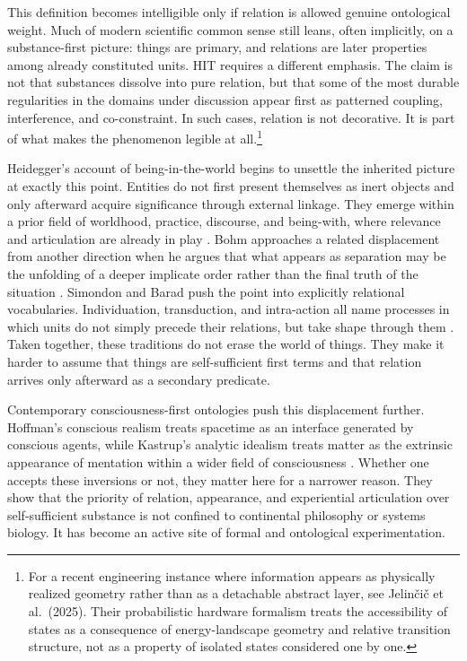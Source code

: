 This definition becomes intelligible only if relation is allowed genuine ontological weight. Much of modern scientific common sense still leans, often implicitly, on a substance-first picture: things are primary, and relations are later properties among already constituted units. HIT requires a different emphasis. The claim is not that substances dissolve into pure relation, but that some of the most durable regularities in the domains under discussion appear first as patterned coupling, interference, and co-constraint. In such cases, relation is not decorative. It is part of what makes the phenomenon legible at all.\footnote{For a recent engineering instance where information appears as physically realized geometry rather than as a detachable abstract layer, see Jelin{\v{c}}i{\v{c}} et al.\ (2025). Their probabilistic hardware formalism treats the accessibility of states as a consequence of energy-landscape geometry and relative transition structure, not as a property of isolated states considered one by one.}

Heidegger's account of being-in-the-world begins to unsettle the inherited picture at exactly this point. Entities do not first present themselves as inert objects and only afterward acquire significance through external linkage. They emerge within a prior field of worldhood, practice, discourse, and being-with, where relevance and articulation are already in play \parencite{heidegger_1927}. Bohm approaches a related displacement from another direction when he argues that what appears as separation may be the unfolding of a deeper implicate order rather than the final truth of the situation \parencite{bohm_1980}. Simondon and Barad push the point into explicitly relational vocabularies. Individuation, transduction, and intra-action all name processes in which units do not simply precede their relations, but take shape through them \parencite{simondon_1958,barad_2007}. Taken together, these traditions do not erase the world of things. They make it harder to assume that things are self-sufficient first terms and that relation arrives only afterward as a secondary predicate.

Contemporary consciousness-first ontologies push this displacement further. Hoffman's conscious realism treats spacetime as an interface generated by conscious agents, while Kastrup's analytic idealism treats matter as the extrinsic appearance of mentation within a wider field of consciousness \parencite{hoffman_2008,kastrup_2017a,kastrup_2017b}. Whether one accepts these inversions or not, they matter here for a narrower reason. They show that the priority of relation, appearance, and experiential articulation over self-sufficient substance is not confined to continental philosophy or systems biology. It has become an active site of formal and ontological experimentation.

